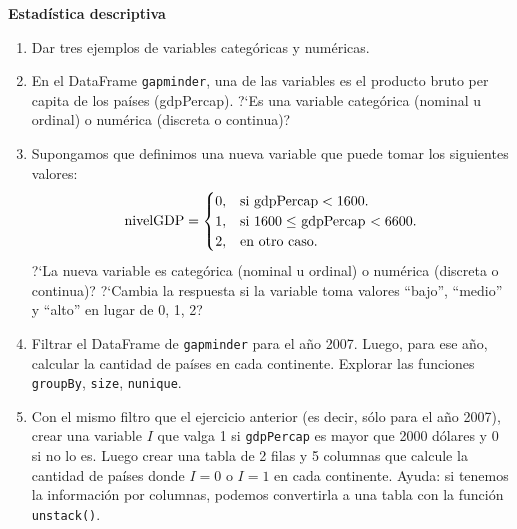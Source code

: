 \documentclass[a4paper,11pt]{article}
\theoremstyle{definition}
\begin{document}
\textbf{\large Estad\'istica descriptiva}
\begin{enumerate}[resume]

\item Dar tres ejemplos de variables categ\'oricas y num\'ericas.

\item En el DataFrame \lstinline{gapminder}, una de las variables es el producto bruto per capita de los pa\'ises (gdpPercap). ?`Es una variable categ\'orica (nominal u ordinal) o num\'erica (discreta o continua)?

\item Supongamos que definimos una nueva variable que puede tomar los siguientes valores:
\[
\text{nivelGDP} = \begin{cases}
0, & \text{si \lstinline{gdpPercap}} < 1600. \\
1, & \text{si $1600 \le $ \lstinline{gdpPercap} $< 6600$}. \\
2, & \text{en otro caso.} \\
\end{cases}
\]
?`La nueva variable
 es categ\'orica (nominal u ordinal) o num\'erica (discreta o continua)? ?`Cambia la respuesta si la variable
 toma valores ``bajo'', ``medio'' y ``alto'' en lugar de 0, 1, 2?

\item Filtrar el DataFrame de \lstinline{gapminder} para el a\~no 2007. Luego, para ese a\~no, calcular la cantidad de pa\'ises en cada continente. Explorar las funciones \lstinline{groupBy}, \lstinline{size}, \lstinline{nunique}.

\item Con el mismo filtro que el ejercicio anterior (es decir, s\'olo para el a\~no 2007), crear una variable $I$
 que valga 1 si \lstinline{gdpPercap} es mayor que 2000 d\'olares y 0 si no lo es. Luego crear una tabla de 2 filas y 5 columnas que calcule la cantidad de pa\'ises donde $I = 0$ o $I = 1$
 en cada continente. Ayuda: si tenemos la información por columnas, podemos convertirla a una tabla con la función \lstinline{unstack()}.



\end{enumerate}
\end{document}
